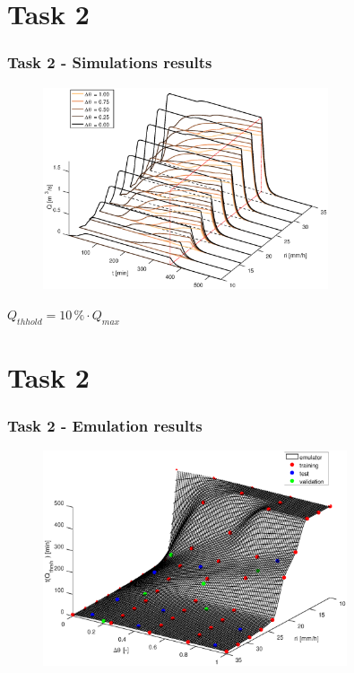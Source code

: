 \documentclass[xcolor=dvipsnames, USenglish]{beamer}  %
\begin{document}
\section{Task 2}
  \begin{frame}
    \frametitle{Task 2 - Simulations results}
    \begin{figure}[t]
      \centering
      \includegraphics[width=0.75\textwidth]{img/hydrographs3d.eps}
    \end{figure}
    {$Q_{thhold} = 10\,\% \cdot Q_{max}$}
  \end{frame}

\section{Task 2}
  \begin{frame}
    \frametitle{Task 2 - Emulation results}
    \begin{figure}[t]
      \centering
      \includegraphics[width=0.8\textwidth]{img/emulator.eps}
    \end{figure}
  \end{frame}
\end{document}

